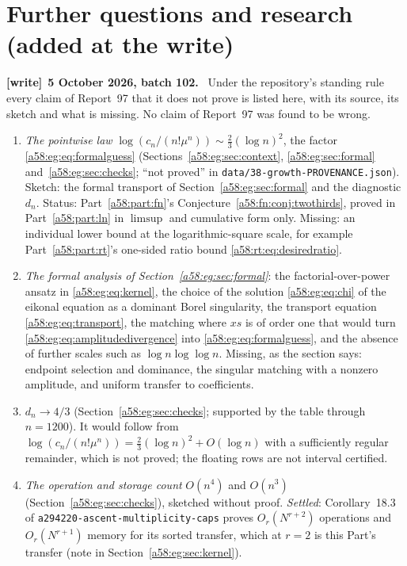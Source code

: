 \documentclass[11pt,letterpaper]{article}
\newcommand{\file}[1]{\nolinkurl{#1}}
\theoremstyle{remark}
\newenvironment{writenote}[1][]{\par\smallskip\begingroup\small
 \noindent\textbf{[write]}\if\relax\detokenize{#1}\relax\else~\textbf{#1.}\fi\ }%
 {\par\endgroup\smallskip}
\begin{document}
\section{Further questions and research (added at the write)}\label{a58:eg:sec:further}
\begin{writenote}[5 October 2026, batch 102]
Under the repository's standing rule every claim of Report~97 that it does not prove is listed here, with its source, its sketch and what is missing. No claim of Report~97 was found to be wrong.
\begin{enumerate}
\item \emph{The pointwise law} $\log(c_n/(n!\mu^n))\sim\frac23(\log n)^2$, the factor \eqref{a58:eg:eq:formalguess} (Sections~\ref{a58:eg:sec:context}, \ref{a58:eg:sec:formal} and~\ref{a58:eg:sec:checks}; ``not proved'' in \file{data/38-growth-PROVENANCE.json}). Sketch: the formal transport of Section~\ref{a58:eg:sec:formal} and the diagnostic $d_n$. Status: Part~\ref{a58:part:fn}'s Conjecture~\ref{a58:fn:conj:twothirds}, proved in Part~\ref{a58:part:ln} in $\limsup$ and cumulative form only. Missing: an individual lower bound at the logarithmic-square scale, for example Part~\ref{a58:part:rt}'s one-sided ratio bound \eqref{a58:rt:eq:desiredratio}.
\item \emph{The formal analysis of Section~\ref{a58:eg:sec:formal}}: the factorial-over-power ansatz in \eqref{a58:eg:eq:kernel}, the choice of the solution \eqref{a58:eg:eq:chi} of the eikonal equation as a dominant Borel singularity, the transport equation \eqref{a58:eg:eq:transport}, the matching where $xs$ is of order one that would turn \eqref{a58:eg:eq:amplitudedivergence} into \eqref{a58:eg:eq:formalguess}, and the absence of further scales such as $\log n\log\log n$. Missing, as the section says: endpoint selection and dominance, the singular matching with a nonzero amplitude, and uniform transfer to coefficients.
\item \emph{$d_n\to4/3$} (Section~\ref{a58:eg:sec:checks}; supported by the table through $n=1200$). It would follow from $\log(c_n/(n!\mu^n))=\frac23(\log n)^2+O(\log n)$ with a sufficiently regular remainder, which is not proved; the floating rows are not interval certified.
\item \emph{The operation and storage count} $O(n^4)$ and $O(n^3)$ (Section~\ref{a58:eg:sec:checks}), sketched without proof. \emph{Settled}: Corollary~18.3 of \file{a294220-ascent-multiplicity-caps} proves $O_r(N^{r+2})$ operations and $O_r(N^{r+1})$ memory for its sorted transfer, which at $r=2$ is this Part's transfer (note in Section~\ref{a58:eg:sec:kernel}).

\end{enumerate}
\end{writenote}
\end{document}
